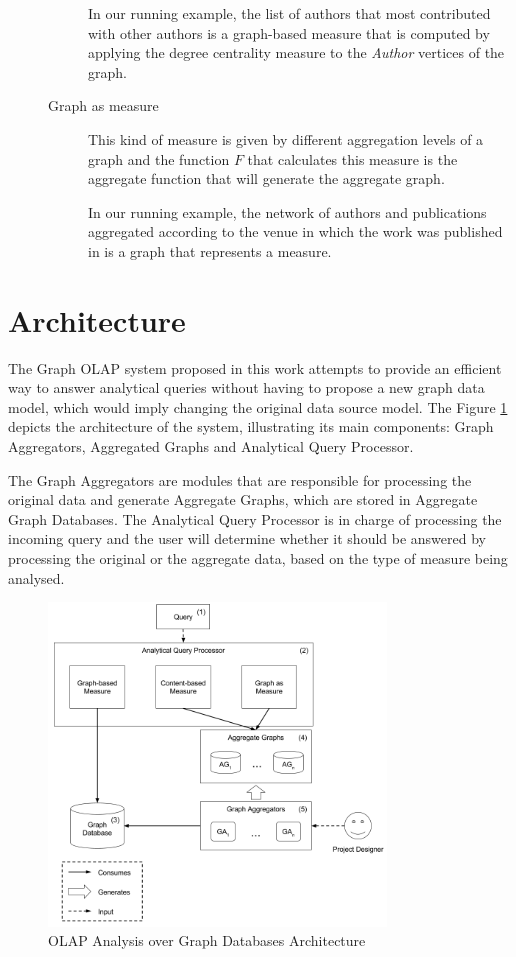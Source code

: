 \begin{description}
\begin{description}
In our running example, the list of authors that most contributed with other authors is a graph-based measure that is computed by applying the degree centrality measure to the \emph{Author} vertices of the graph.
\item[Graph as measure] This kind of measure is given by different aggregation levels of a graph and the function $F$ that calculates this measure is the aggregate function that will generate the aggregate graph. 

In our running example, the network of authors and  publications aggregated according to the venue in which the work was published in is a graph that represents a measure.
\end{description}
\end{description}

\section{Architecture}

The Graph OLAP system proposed in this work attempts to provide an efficient way to answer analytical queries without having to propose a new graph data model, which would imply changing the original data source model. The Figure \ref{fig:figure27} depicts the architecture of the system, illustrating its main components: Graph Aggregators, Aggregated Graphs and Analytical Query Processor.

The Graph Aggregators are modules that are responsible for processing the original data and generate Aggregate Graphs, which are stored in Aggregate Graph Databases. The Analytical Query Processor is in charge of processing the incoming query and the user will determine whether it should be answered by processing the original or the aggregate data, based on the type of measure being analysed.

\begin{figure}[ht]
\centering
\includegraphics[width=0.8\textwidth]{../Architecture.png}
\caption{OLAP Analysis over Graph Databases Architecture}
\label{fig:figure27}
\end{figure}

